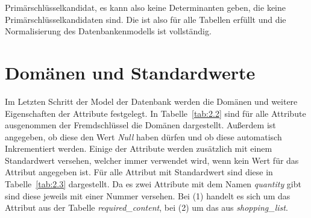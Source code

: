 Primärschlüsselkandidat, es kann also keine Determinanten geben, die keine Primärschlüsselkandidaten sind. Die  ist also für alle Tabellen erfüllt und die Normalisierung des Datenbankenmodells ist vollständig.

\section{Domänen und Standardwerte}\label{sec:Domänen und Standardwerte}

Im Letzten Schritt der Model der Datenbank werden die Domänen und weitere Eigenschaften der Attribute festgelegt. In Tabelle~\ref{tab:2.2} sind für alle Attribute ausgenommen der Fremdschlüssel die Domänen dargestellt. Außerdem ist angegeben, ob diese den Wert \textit{Null} haben dürfen und ob diese automatisch Inkrementiert werden. Einige der Attribute werden zusätzlich mit einem Standardwert versehen, welcher immer verwendet wird, wenn kein Wert für das Attribut angegeben ist. Für alle Attribut mit Standardwert sind diese in Tabelle~\ref{tab:2.3} dargestellt. Da es zwei Attribute mit dem Namen \textit{quantity} gibt sind diese jeweils mit einer Nummer versehen. Bei (1) handelt es sich um das Attribut aus der Tabelle \textit{required\_content}, bei (2) um das aus \textit{shopping\_list}.

